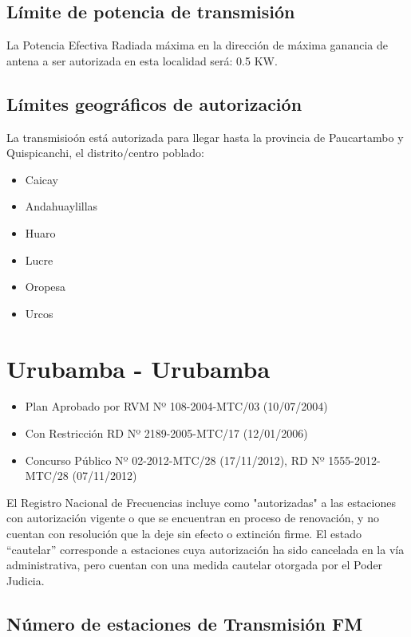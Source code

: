 \documentclass[11pt]{article}
\begin{document}
\subsection{Límite de potencia de transmisión}

La Potencia Efectiva Radiada máxima en la dirección de máxima ganancia de antena a ser autorizada en esta localidad será: 0.5 KW.

\subsection{Límites geográficos de autorización}

La transmisioón está autorizada para llegar hasta la provincia de Paucartambo y Quispicanchi, el distrito/centro poblado:

\begin{itemize}
	\item Caicay
	\item Andahuaylillas
	\item Huaro
	\item Lucre
	\item Oropesa
	\item Urcos
\end{itemize}



\section{Urubamba - Urubamba}

\begin{itemize}
	\item Plan Aprobado por RVM Nº 108-2004-MTC/03 (10/07/2004)
	\item Con Restricción RD Nº 2189-2005-MTC/17 (12/01/2006)
	\item Concurso Público Nº 02-2012-MTC/28 (17/11/2012), RD Nº 1555-2012-MTC/28 (07/11/2012)
\end{itemize}

El Registro Nacional de Frecuencias incluye como "autorizadas" a las estaciones con autorización vigente o que se encuentran en proceso de renovación, y no cuentan con resolución que la deje sin efecto o extinción firme. El estado “cautelar” corresponde a estaciones cuya autorización ha sido cancelada en la vía administrativa, pero cuentan con una medida cautelar otorgada por el Poder Judicia.

\subsection{Número de estaciones de Transmisión FM}
\end{document}
